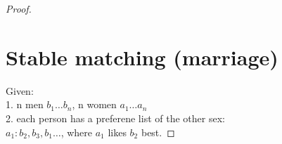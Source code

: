 \begin{proof}
\section{Stable matching (marriage)}
Given:\\ 
1. n men $b_{1} \dots b_{n}$, n women $a_{1} \dots a_{n}$\\
2. each person has a preferene list of the other sex: \\
$a_{1}: b_{2}, b_{3}, b_{1} \dots$, where $a_{1}$ likes $b_{2}$ best.
\end{proof}